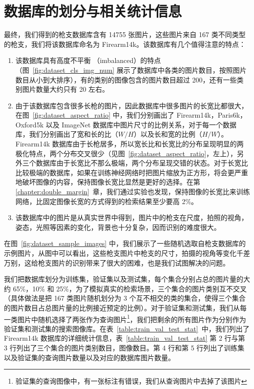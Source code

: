 \section{数据库的划分与相关统计信息}\label{sec:dataset_stats}
最终，我们得到的枪支数据库含有 14755 张图片，这些图片来自 167 类不同类型的枪支，我们将该数据库命名为 Firearm14k。该数据库有几个值得注意的特点：

\begin{enumerate}
\item  该数据库具有高度不平衡 （imbalanced）的特点（图~\ref{fig:dataset_cls_img_num} 展示了数据库中各类的图片数目，按照图片数目从小到大排序），有的类别的图像包含的图片数目超过 200，还有一些类别图片数量大约只有 20 左右。

\item  由于该数据库包含很多长枪的图片，因此数据库中很多图片的长宽比都很大，在图~\ref{fig:dataset_aspect_ratio} 中，我们分别画出了 Firearm14k，Paris6k，Oxford5k 以及 ImageNet 数据库中图片尺寸的比例关系，对于每一个数据库，我们分别画出了宽和长的比（$W/H$）以及长和宽的比例（$H/W$）。Firearm14k 数据库由于长枪居多，所以宽长比和长宽比的分布呈现明显的两极化特点，两个分布交叉很少（见图~\ref{fig:dataset_aspect_ratio}，左上），另外三个数据库由于长宽比不那么极端，两个分布呈现交错的状态。对于长宽比比较极端的数据库，如果在训练神经网络时把图片缩放为正方形，将会更严重地破坏图像的内容，保持图像长宽比显然是更好的选择。在第 \ref{chapter:double_margin}~章，我们通过实验也发现，保持图像的长宽比来训练网络，比固定图像长宽的方式得到的检索结果至少要高 2\%。

\item 该数据库中的图片是从真实世界中得到，图片中的枪支在尺度，拍照的视角，姿态，光照等因素的变化，背景也十分复杂，因而识别的难度很大。
\end{enumerate}

在图~\ref{fig:dataset_sample_images} 中，我们展示了一些随机选取自枪支数据库的示例图片，从图中可以看出，这些枪支图片中枪支的尺寸，拍摄的视角等变化千差万别，这给枪支图片的识别带来了很大的困难，也是我们试图解决的问题。

我们把数据库划分为训练集，验证集以及测试集，每个集合分别占总的图片量的大约 65\%，10\% 和 25\%，为了模拟真实的检索场景，三个集合的图片类别互不交叉 （具体做法是把 167 类图片随机划分为 3 个互不相交的类的集合，使得三个集合的图片数目占总图片量的比例接近预定的比例）。对于验证集和测试集，我们从每一类图片中随机选择了两张作为查询图片\footnote{验证集的查询图像中，有一张标注有错误，我们从查询图片中去掉了该图片}，我们把剩余的所有图片作为分别作为验证集和测试集的搜索图像库。在表~\ref{table:train_val_test_stat}~中，我们列出了 Firearm14k 数据库的详细统计信息，表~\ref{table:train_val_test_stat} 第 2 行与第 3 行列出了三个集合的图片类别数目，图像数目。第 4 行和第 5 行列出了训练集以及验证集的查询图片数量以及对应的数据库图片数量。

